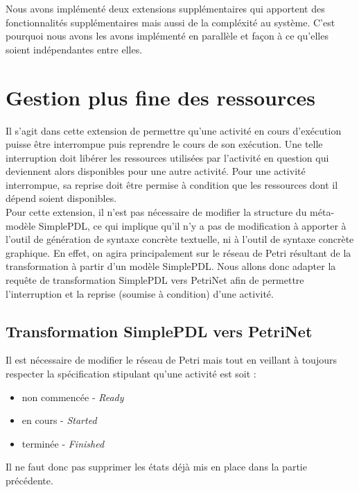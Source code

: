 Nous avons implémenté deux extensions supplémentaires qui apportent des fonctionnalités supplémentaires mais aussi de la compléxité au système. C'est pourquoi nous avons les avons implémenté en parallèle et façon à ce qu'elles soient indépendantes entre elles.

\section{Gestion plus fine des ressources}

Il s'agit dans cette extension de permettre qu'une activité en cours d'exécution puisse être interrompue puis reprendre le cours de son exécution. Une telle interruption doit libérer les ressources utilisées par l'activité en question qui deviennent alors disponibles pour une autre activité. Pour une activité interrompue, sa reprise doit être permise à condition que les ressources dont il dépend soient disponibles.\\
Pour cette extension, il n'est pas nécessaire de modifier la structure du méta-modèle SimplePDL, ce qui implique qu'il n'y a pas de modification à apporter à l'outil de génération de syntaxe concrète textuelle, ni à l'outil de syntaxe concrète graphique. En effet, on agira principalement sur le réseau de Petri résultant de la transformation à partir d'un modèle SimplePDL. Nous allons donc adapter la requête de transformation SimplePDL vers PetriNet afin de permettre l'interruption et la reprise (soumise à condition) d'une activité.

\subsection{Transformation SimplePDL vers PetriNet}

Il est nécessaire de modifier le réseau de Petri mais tout en veillant à toujours respecter la spécification stipulant qu'une activité est soit :
\begin{itemize}
\item non commencée - \textit{Ready}
\item en cours - \textit{Started}
\item terminée - \textit{Finished}
\end{itemize}
Il ne faut donc pas supprimer les états déjà mis en place dans la partie précédente.\\

